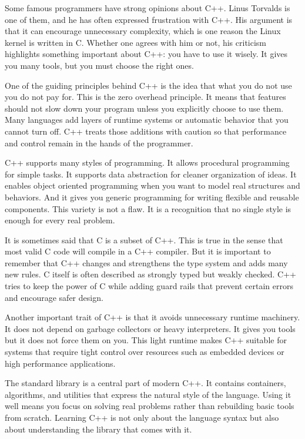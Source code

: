 \documentclass[12pt,letterpaper]{book}
\theoremstyle{definition}
\theoremstyle{remark}
\begin{document}
Some famous programmers have strong opinions about C++. Linus Torvalds is one of them, and he has often expressed frustration with C++. His argument is that it can encourage unnecessary complexity, which is one reason the Linux kernel is written in C. Whether one agrees with him or not, his criticism highlights something important about C++: you have to use it wisely. It gives you many tools, but you must choose the right ones.

One of the guiding principles behind C++ is the idea that what you do not use you do not pay for. This is the zero overhead principle. It means that features should not slow down your program unless you explicitly choose to use them. Many languages add layers of runtime systems or automatic behavior that you cannot turn off. C++ treats those additions with caution so that performance and control remain in the hands of the programmer.

C++ supports many styles of programming. It allows procedural programming for simple tasks. It supports data abstraction for cleaner organization of ideas. It enables object oriented programming when you want to model real structures and behaviors. And it gives you generic programming for writing flexible and reusable components. This variety is not a flaw. It is a recognition that no single style is enough for every real problem.

It is sometimes said that C is a subset of C++. This is true in the sense that most valid C code will compile in a C++ compiler. But it is important to remember that C++ changes and strengthens the type system and adds many new rules. C itself is often described as strongly typed but weakly checked. C++ tries to keep the power of C while adding guard rails that prevent certain errors and encourage safer design.

Another important trait of C++ is that it avoids unnecessary runtime machinery. It does not depend on garbage collectors or heavy interpreters. It gives you tools but it does not force them on you. This light runtime makes C++ suitable for systems that require tight control over resources such as embedded devices or high performance applications.

The standard library is a central part of modern C++. It contains containers, algorithms, and utilities that express the natural style of the language. Using it well means you focus on solving real problems rather than rebuilding basic tools from scratch. Learning C++ is not only about the language syntax but also about understanding the library that comes with it.
\end{document}
